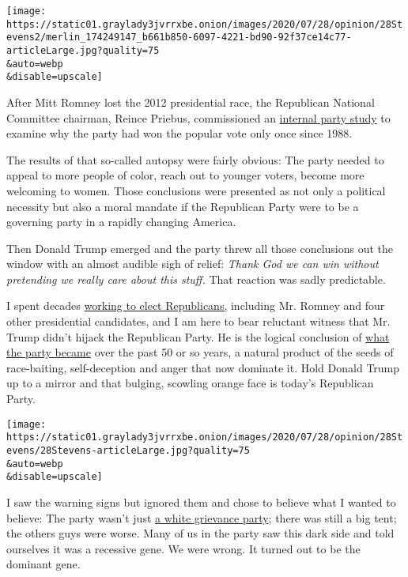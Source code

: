 \texttt{[image: https://static01.graylady3jvrrxbe.onion/images/2020/07/28/opinion/28Stevens2/merlin\_174249147\_b661b850-6097-4221-bd90-92f37ce14c77-articleLarge.jpg?quality=75\\\&auto=webp\\\&disable=upscale]}

After Mitt Romney lost the 2012 presidential race, the Republican
National Committee chairman, Reince Priebus, commissioned an
\href{https://www.nytimes3xbfgragh.onion/2013/03/19/us/politics/republicans-plan-overhaul-for-2016-primary-season.html}{internal
party study} to examine why the party had won the popular vote only once
since 1988.

The results of that so-called autopsy were fairly obvious: The party
needed to appeal to more people of color, reach out to younger voters,
become more welcoming to women. Those conclusions were presented as not
only a political necessity but also a moral mandate if the Republican
Party were to be a governing party in a rapidly changing America.

Then Donald Trump emerged and the party threw all those conclusions out
the window with an almost audible sigh of relief: \emph{Thank God we can
win without pretending we really care about this stuff.} That reaction
was sadly predictable.

I spent decades
\href{https://www.nytimes3xbfgragh.onion/2020/07/16/us/politics/trump-republicans.html}{working
to elect Republicans,} including Mr. Romney and four other presidential
candidates, and I am here to bear reluctant witness that Mr. Trump
didn't hijack the Republican Party. He is the logical conclusion of
\href{https://www.nytimes3xbfgragh.onion/2020/03/18/opinion/trump-republicans-racism.html}{what
the party became} over the past 50 or so years, a natural product of the
seeds of race-baiting, self-deception and anger that now dominate it.
Hold Donald Trump up to a mirror and that bulging, scowling orange face
is today's Republican Party.

\texttt{[image: https://static01.graylady3jvrrxbe.onion/images/2020/07/28/opinion/28Stevens/28Stevens-articleLarge.jpg?quality=75\\\&auto=webp\\\&disable=upscale]}

I saw the warning signs but ignored them and chose to believe what I
wanted to believe: The party wasn't just
\href{https://www.nytimes3xbfgragh.onion/2020/03/18/opinion/trump-republicans-racism.html}{a
white grievance party}; there was still a big tent; the others guys were
worse. Many of us in the party saw this dark side and told ourselves it
was a recessive gene. We were wrong. It turned out to be the dominant
gene.

